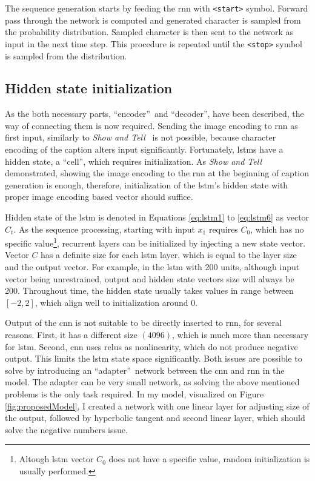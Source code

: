 The sequence generation starts by feeding the \gls{rnn} with \texttt{<start>} symbol. Forward pass through the network is computed and generated character is sampled from the probability distribution. Sampled character is then sent to the network as input in the next time step. This procedure is repeated until the \texttt{<stop>} symbol is sampled from the distribution.

\subsection{Hidden state initialization} \label{subsec:initialization}

As the both necessary parts, \textquotedblleft encoder\textquotedblright\ and \textquotedblleft decoder\textquotedblright, have been described, the way of connecting them is now required. Sending the image encoding to \gls{rnn} as first input, similarly to \emph{Show and Tell}~\cite{DBLP:journals/corr/VinyalsTBE14} is not possible, because character encoding of the caption alters input significantly. Fortunately, \gls{lstm}s have a hidden state, a \textquotedblleft cell\textquotedblright, which requires initialization. As \emph{Show and Tell}~\cite{DBLP:journals/corr/VinyalsTBE14} demonstrated, showing the image encoding to the \gls{rnn} at the beginning of caption generation is enough, therefore, initialization of the \gls{lstm}'s hidden state with proper image encoding based vector should suffice.

Hidden state of the \gls{lstm} is denoted in Equations \eqref{eq:lstm1} to \eqref{eq:lstm6} as vector $ C_t $. As the sequence processing, starting with input $ x_1 $ requires $ C_0 $, which has no specific value\footnote{Altough \gls{lstm} vector $ C_0 $ does not have a specific value, random initialization is usually performed.}, recurrent layers can be initialized by injecting a new state vector. Vector $ C $ has a definite size for each \gls{lstm} layer, which is equal to the layer size and the output vector. For example, in the \gls{lstm} with 200 units, although input vector being unrestrained,  output and hidden state vectors size will always be 200. Throughout time, the hidden state usually takes values in range between $ [-2 , 2] $, which align well to initialization around $ 0 $.

Output of the \gls{cnn} is not suitable to be directly inserted to \gls{rnn}, for several reasons. First, it has a different size $ (4096) $, which is much more than necessary for \gls{lstm}. Second, \gls{cnn} uses \gls{relu}s as nonlinearity, which do not produce negative output. This limits the \gls{lstm} state space significantly. Both issues are possible to solve by introducing an \textquotedblleft adapter\textquotedblright\ network between the \gls{cnn} and \gls{rnn} in the model. The adapter can be very small network, as solving the above mentioned problems is the only task required. In my model, visualized on Figure \ref{fig:proposedModel}, I created a network with one linear layer for adjusting size of the output, followed by hyperbolic tangent and second linear layer, which should solve the negative numbers issue.

